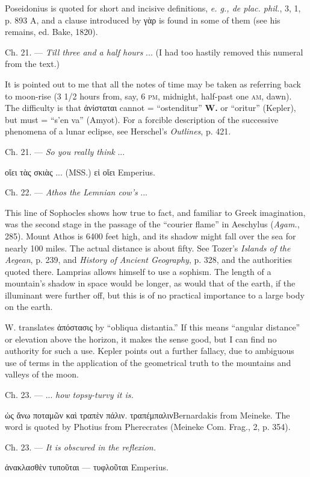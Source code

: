 \documentclass[a4paper, 11pt, oneside, polutonikogreek, english]{article}
\begin{document}
Poseidonius is quoted for short and incisive definitions, \emph{e. g., de plac. phil.}, 3, 1, p. 893 A, and a clause introduced by γὰρ is found in some of them (see his remains, ed. Bake, 1820).

Ch. 21. --- \emph{Till three and a half hours} ... (I had too hastily removed this numeral from the text.)

It is pointed out to me that all the notes of time may be taken as referring back to moon-rise (3 1/2 hours from, say, 6 \textsc{pm}, midnight, half-past one \textsc{am}, dawn). The difficulty is that ἀνίσταται cannot = ``ostenditur'' \textbf{W.} or ``oritur'' (Kepler), but must = ``s'en va'' (Amyot). For a forcible description of the successive phenomena of a lunar eclipse, see Herschel's \emph{Outlines}, p. 421.

Ch. 21. --- \emph{So you really think} ...

οἴει τὰς σκιὰς ... (MSS.) εἰ οἴει Emperius.

Ch. 22. --- \emph{Athos the Lemnian cow's} ...

This line of Sophocles shows how true to fact, and familiar to Greek imagination, was the second stage in the passage of the ``courier flame'' in Aeschylus (\emph{Agam.}, 285). Mount Athos is 6400 feet high, and its shadow might fall over the sea for nearly 100 miles. The actual distance is about fifty. See Tozer's \emph{Islands of the Aegean}, p. 239, and \emph{History of Ancient Geography}, p. 328, and the authorities quoted there. Lamprias allows himself to use a sophism. The length of a mountain's shadow in space would be longer, as would that of the earth, if the illuminant were further off, but this is of no practical importance to a large body on the earth.

W. translates ἀπόστασις by ``obliqua distantia.'' If this means ``angular distance'' or elevation above the horizon, it makes the sense good, but I can find no authority for such a use. Kepler points out a further fallacy, due to ambiguous use of terms in the application of the geometrical truth to the mountains and valleys of the moon.

Ch. 23. --- ... \emph{how topsy-turvy it is.}

ὡς ἄνω ποταμῶν καὶ τραπὲν πάλιν. τραπέμπαλινBernardakis from Meineke. The word is quoted by Photius from Pherecrates (Meineke Com. Frag., 2, p. 354).

Ch. 23. --- \emph{It is obscured in the reflexion.}

ἀνακλασθὲν τυποῦται --- τυφλοῦται Emperius.
\end{document}
